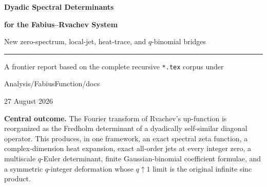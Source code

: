 \documentclass[11pt,oneside]{article}
\numberwithin{equation}{section}
\theoremstyle{plain}
\theoremstyle{definition}
\theoremstyle{remark}
\begin{document}

\begin{titlepage}
\centering
\vspace*{18mm}
{\Huge\bfseries\color{DeepBlue} Dyadic Spectral Determinants\par}
\vspace{3mm}
{\LARGE\bfseries for the Fabius--Rvachev System\par}
\vspace{7mm}
{\Large New zero-spectrum, local-jet, heat-trace, and $q$-binomial bridges\par}
\vspace{16mm}
\rule{0.82\textwidth}{0.6pt}\par
\vspace{10mm}
{\large A frontier report based on the complete recursive \texttt{*.tex} corpus under\par}
\vspace{3mm}
{\small\ttfamily Analysis/FabiusFunction/docs\par}
\vspace{10mm}
{\large 27 August 2026\par}
\vfill
\begin{minipage}{0.88\textwidth}
\small
\textbf{Central outcome.}
The Fourier transform of Rvachev's up-function is reorganized as the Fredholm determinant of a dyadically self-similar diagonal operator.  This produces, in one framework, an exact spectral zeta function, a complex-dimension heat expansion, exact all-order jets at every integer zero, a multiscale $q$-Euler determinant, finite Gaussian-binomial coefficient formulae, and a symmetric $q$-integer deformation whose $q\uparrow1$ limit is the original infinite sinc product.
\end{minipage}
\vspace{12mm}
\end{titlepage}
\end{document}
